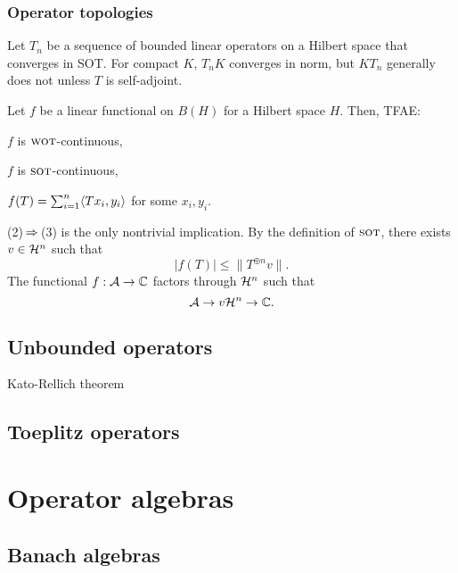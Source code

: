 \documentclass{../../large}
\newcommand{\wot}{{\text{\sc wot}}}
\newcommand{\sot}{{\text{\sc sot}}}
\begin{document}
\section{Operator topologies}


\begin{prb}
Let $T_n$ be a sequence of bounded linear operators on a Hilbert space that converges in SOT.
For compact $K$, $T_n K$ converges in norm, but $KT_n$ generally does not unless $T$ is self-adjoint.
\end{prb}

\begin{prb}
Let $f$ be a linear functional on $B(H)$ for a Hilbert space $H$.
Then, TFAE:
\begin{parts}
\item $f$ is $\wot$-continuous,
\item $f$ is $\sot$-continuous,
\item $f(T)=\sum_{i=1}^n\langle Tx_i,y_i\rangle$ for some $x_i,y_i$.
\end{parts}
\end{prb}
\begin{pf}
(2)$\impl$(3) is the only nontrivial implication.
By the definition of $\sot$, there exists $v\in \mathcal{H}^n$ such that
\[|f(T)|\le\|T^{\oplus n}v\|.\]
The functional $f:\mathcal{A}\to\mathbb{C}$ factors through $\mathcal{H}^n$ such that
\[\mathcal{A}\to{v}\mathcal{H}^n\to\mathbb{C}.\]
\end{pf}






\chapter{Unbounded operators}



Kato-Rellich theorem




\chapter{Toeplitz operators}








\part{Operator algebras}
\chapter{Banach algebras}
\end{document}
